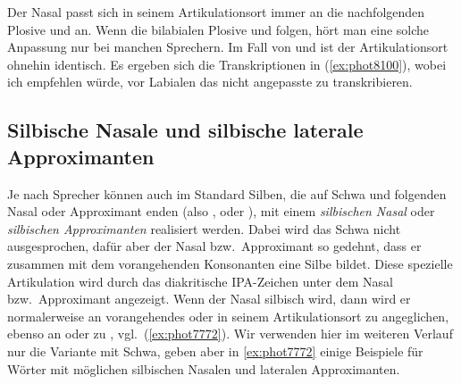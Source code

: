 \begin{exe}
  \ex\label{ex:phot7303}
  \begin{xlist}
  \end{xlist}
\end{exe}

Der Nasal \textipa{[n]} passt sich in seinem Artikulationsort immer an die nachfolgenden Plosive \textipa{[k]} und \textipa{[g]} an.
Wenn die bilabialen Plosive \textipa{[p]} und \textipa{[b]} folgen, hört man eine solche Anpassung nur bei manchen Sprechern.
Im Fall von \textipa{[t]} und \textipa{[d]} ist der Artikulationsort ohnehin identisch.
Es ergeben sich die Transkriptionen in (\ref{ex:phot8100}), wobei ich empfehlen würde, vor Labialen das nicht angepasste \textipa{[n]} zu transkribieren.

\begin{exe}
  \ex\label{ex:phot8100}
  \begin{xlist}
    \ex{\textipa{[klINk@]}, \textipa{[baNk]}, \textipa{[PUNg@n\t{aO}]}}
  \end{xlist}
\end{exe}

\subsection{Silbische Nasale und silbische laterale Approximanten}

\label{sec:silbnasal}

Je nach Sprecher können auch im Standard Silben, die auf Schwa und folgenden Nasal oder Approximant enden (also \textipa{[@n]}, \textipa{[@m]} oder \textipa{[@l]}), mit einem \textit{silbischen Nasal} oder \textit{silbischen Approximanten} realisiert werden.
Dabei wird das Schwa nicht ausgesprochen, dafür aber der Nasal bzw.\ Approximant so gedehnt, dass er zusammen mit dem vorangehenden Konsonanten eine Silbe bildet.
Diese spezielle Artikulation wird durch das diakritische IPA-Zeichen \textipa{[\s{ }]} unter dem Nasal bzw.\ Approximant angezeigt.
Wenn der Nasal \textipa{[n]} silbisch wird, dann wird er normalerweise an vorangehendes \textipa{[b]} oder \textipa{[p]} in seinem Artikulationsort zu \textipa{[m]} angeglichen, ebenso an \textipa{[g]} oder \textipa{[k]} zu \textipa{[N]}, vgl.\ (\ref{ex:phot7772}).
Wir verwenden hier im weiteren Verlauf nur die Variante mit Schwa, geben aber in \ref{ex:phot7772} einige Beispiele für Wörter mit möglichen silbischen Nasalen und lateralen Approximanten.

